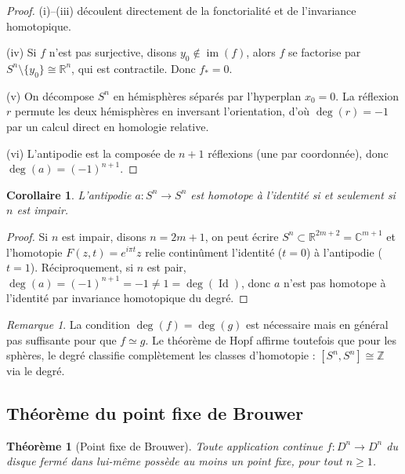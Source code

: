 \documentclass[12pt,a4paper,openany]{book}
\theoremstyle{definition}
\theoremstyle{plain}
\newtheorem{theoreme}[definition]{Théorème}
\newtheorem{corollaire}[definition]{Corollaire}
\theoremstyle{remark}
\newtheorem{remarque}[definition]{Remarque}
\newcommand{\Z}{\mathbb{Z}}
\newcommand{\R}{\mathbb{R}}
\newcommand{\C}{\mathbb{C}}
\DeclareMathOperator{\im}{im}
\DeclareMathOperator{\Id}{Id}
\begin{document}
\begin{proof}
(i)--(iii) découlent directement de la fonctorialité et de l'invariance homotopique.

(iv) Si $f$ n'est pas surjective, disons $y_0 \notin \im(f)$, alors $f$ se factorise par
$S^n \setminus \{y_0\} \cong \R^n$, qui est contractile. Donc $f_* = 0$.

(v) On décompose $S^n$ en hémisphères séparés par l'hyperplan $x_0 = 0$.
La réflexion $r$ permute les deux hémisphères en inversant l'orientation,
d'où $\deg(r) = -1$ par un calcul direct en homologie relative.

(vi) L'antipodie est la composée de $n+1$ réflexions (une par coordonnée),
donc $\deg(a) = (-1)^{n+1}$.
\end{proof}

\begin{corollaire}\label{cor:antipodie-homotopie}
L'antipodie $a \colon S^n \to S^n$ est homotope à l'identité si et seulement si $n$ est impair.
\end{corollaire}

\begin{proof}
Si $n$ est impair, disons $n = 2m+1$, on peut écrire $S^n \subset \R^{2m+2} = \C^{m+1}$ et
l'homotopie $F(z, t) = e^{i\pi t} z$ relie continûment l'identité ($t=0$) à l'antipodie ($t=1$).
Réciproquement, si $n$ est pair, $\deg(a) = (-1)^{n+1} = -1 \neq 1 = \deg(\Id)$, donc $a$
n'est pas homotope à l'identité par invariance homotopique du degré.
\end{proof}

\begin{remarque}\label{rem:degre-condition-necessaire}
La condition $\deg(f) = \deg(g)$ est nécessaire mais en général pas suffisante pour que
$f \simeq g$. Le théorème de Hopf affirme toutefois que pour les sphères, le degré classifie
complètement les classes d'homotopie : $[S^n, S^n] \cong \Z$ via le degré.
\end{remarque}

\subsection{Théorème du point fixe de Brouwer}\label{subsec:brouwer}

\begin{theoreme}[Point fixe de Brouwer]\label{thm:brouwer-point-fixe}
Toute application continue $f \colon D^n \to D^n$ du disque fermé dans lui-même possède au
moins un point fixe, pour tout $n \geq 1$.
\end{theoreme}
\end{document}

